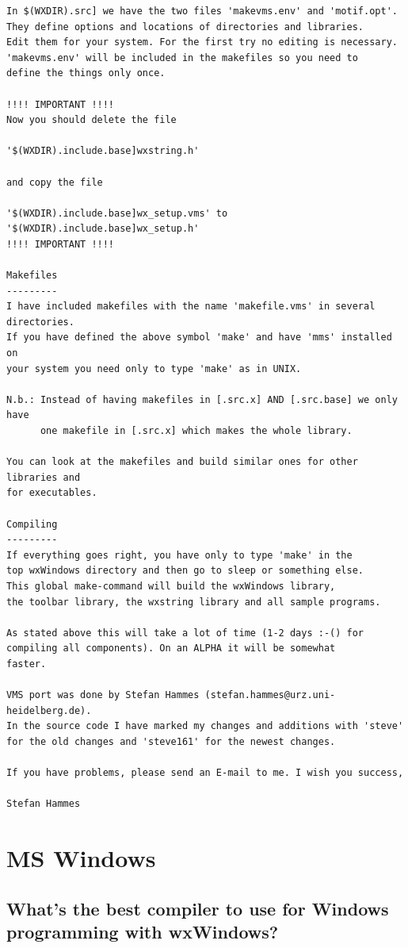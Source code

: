\begin{verbatim}
In $(WXDIR).src] we have the two files 'makevms.env' and 'motif.opt'. 
They define options and locations of directories and libraries. 
Edit them for your system. For the first try no editing is necessary.
'makevms.env' will be included in the makefiles so you need to
define the things only once.

!!!! IMPORTANT !!!!
Now you should delete the file 

'$(WXDIR).include.base]wxstring.h' 

and copy the file 

'$(WXDIR).include.base]wx_setup.vms' to '$(WXDIR).include.base]wx_setup.h'
!!!! IMPORTANT !!!!

Makefiles
---------
I have included makefiles with the name 'makefile.vms' in several directories. 
If you have defined the above symbol 'make' and have 'mms' installed on
your system you need only to type 'make' as in UNIX.

N.b.: Instead of having makefiles in [.src.x] AND [.src.base] we only have
      one makefile in [.src.x] which makes the whole library.

You can look at the makefiles and build similar ones for other libraries and
for executables.

Compiling
---------
If everything goes right, you have only to type 'make' in the 
top wxWindows directory and then go to sleep or something else. 
This global make-command will build the wxWindows library, 
the toolbar library, the wxstring library and all sample programs.

As stated above this will take a lot of time (1-2 days :-() for
compiling all components). On an ALPHA it will be somewhat
faster.

VMS port was done by Stefan Hammes (stefan.hammes@urz.uni-heidelberg.de).
In the source code I have marked my changes and additions with 'steve'
for the old changes and 'steve161' for the newest changes.

If you have problems, please send an E-mail to me. I wish you success,

Stefan Hammes
\end{verbatim}

\section{MS Windows}

\subsection{What's the best compiler to use for Windows programming with wxWindows?}

